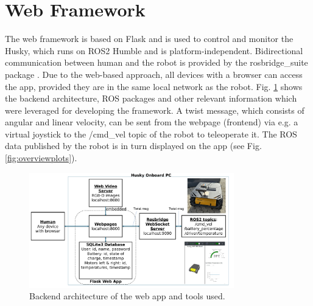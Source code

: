 \documentclass[letterpaper, 10 pt, conference]{ieeeconf}  %
\begin{document}
\section{Web Framework}
\label{sec:framework}

The web framework is based on Flask \cite{flask} and is used to control and monitor the Husky, which runs on ROS2 Humble and is platform-independent. 
Bidirectional communication between human and the robot is provided by the rosbridge\_suite package \cite{rosbridgeSuite}.   
Due to the web-based approach, all devices with a browser can access the app, provided they are in the same local network as the robot.
Fig. \ref{fig:userapp} shows the backend architecture, ROS packages and other relevant information which were leveraged for developing the framework. 
A twist message, which consists of angular and linear velocity, can be sent from the webpage (frontend) via e.g. 
a virtual joystick to the /cmd\_vel topic of the robot to teleoperate it. The ROS data published by the robot is in turn displayed on the app (see Fig. \ref{fig:overviewplots}).

\begin{figure}[t]
    \centerline{\includegraphics[width=8.9cm]{images/ROS_Web_App_Architecture.pdf}}
    \caption{Backend architecture of the web app and tools used.}
    \label{fig:userapp}
\end{figure}
\end{document}
